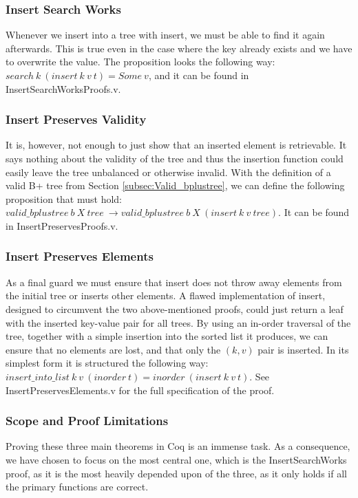 \subsubsection{Insert Search Works}
Whenever we insert into a tree with insert, we must be able to find it again afterwards. This is true even in the case where the key already exists and we have to overwrite the value. The proposition looks the following way: $search\ k\ (insert\ k\ v\ t) = Some\ v$, and it can be found in InsertSearchWorksProofs.v.

\subsubsection{Insert Preserves Validity}
It is, however, not enough to just show that an inserted element is retrievable. It says nothing about the validity of the tree and thus the insertion function could easily leave the tree unbalanced or otherwise invalid. With the definition of a valid B+ tree from Section \ref{subsec:Valid_bplustree}, we can define the following proposition that must hold: $valid\_bplustree\ b\ X\ tree\ \rightarrow valid\_bplustree\ b\ X\ (insert\ k\ v\ tree)$. It can be found in InsertPreservesProofs.v.

\subsubsection{Insert Preserves Elements}
As a final guard we must ensure that insert does not throw away elements from the initial tree or inserts other elements. A flawed implementation of insert, designed to circumvent the two above-mentioned proofs, could just return a leaf with the inserted key-value pair for all trees. By using an in-order traversal of the tree, together with a simple insertion into the sorted list it produces, we can ensure that no elements are lost, and that only the $(k, v)$ pair is inserted. In its simplest form it is structured the following way: $insert\_into\_list\ k\ v\ (inorder\ t) = inorder\ (insert\ k\ v\ t)$. See InsertPreservesElements.v for the full specification of the proof.

\subsubsection{Scope and Proof Limitations}
Proving these three main theorems in Coq is an immense task. As a consequence, we have chosen to focus on the most central one, which is the InsertSearchWorks proof, as it is the most heavily depended upon of the three, as it only holds if all the primary functions are correct.

